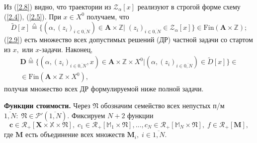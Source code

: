\documentclass[10pt]{SPIIRAS_Proceedings}
\begin{document}
Из (\ref{2.8}) видно,
что траектории из
$\mathcal{Z}_\alpha[x]$
реализуют в строгой форме схему (\ref{2.4}), (\ref{2.5}).
При $x \in X^0$
получаем, что
\begin{equation}\label{2.9}
  \tilde{D}[x] \stackrel{\triangle}{=}
  \{(\alpha,(z_i)_{i \in \overline{0,N}}) \in \mathbf{A} \times \mathbb{Z}
  \vert \;(z_i)_{i \in \overline{0,N}} \in \mathcal{Z}_\alpha[x]\}
  \in \mathrm{Fin}(\mathbf{A} \times \mathbb{Z});
\end{equation}
(\ref{2.9}) есть множество всех допустимых решений (ДР)
частной задачи со стартом из $x,$ или $x$-задачи.
Наконец,
\begin{multline}\label{2.10}
  \mathbf{D} \stackrel{\triangle}{=}
  \{(\alpha,(z_i)_{i \in \overline{0,N}},x) \in \mathbf{A} \times \mathbb{Z} \times X^0 \vert
  (\alpha,(z_i)_{i \in \overline{0,N}}) \in \tilde{D}[x]\}
  \in
  \\
  \in \mathrm{Fin}(\mathbf{A} \times \mathbb{Z} \times X^0),
\end{multline}
получая множество всех ДР формулируемой ниже полной задачи.

{\bf Функции стоимости.}
Через $\mathfrak{N}$
обозначим семейство всех непустых п/м
$\overline{1,N}:\;\mathfrak{N} \in \mathcal{P}'(\overline{1,N}).$
Фиксируем $N + 2$ функции
\begin{equation}\label{2.11}
  \mathbf{c} \in \mathcal{R}_+[\mathbf{X} \times \mathbb{X} \times \mathfrak{N}],\;
  c_1 \in \mathcal{R}_+[\mathbb{M}_1 \times \mathfrak{N}],...,
  c_N \in \mathcal{R}_+[\mathbb{M}_N \times \mathfrak{N}],\;
  f \in \mathcal{R}_+[\mathbf{M}],
\end{equation}
где $\mathbf{M}$
есть объединение всех множеств
$\mathbf{M}_i,\;i \in \overline{1,N}.$
\end{document}

